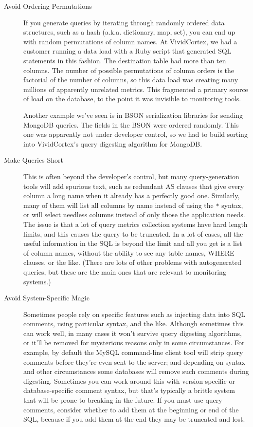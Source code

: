 \documentclass{vivid_layout}
\begin{document}
\begin{description}
\item[Avoid Ordering Permutations] If you generate queries by iterating through
randomly ordered data structures, such as a hash (a.k.a. dictionary, map, set),
you can end up with random permutations of column names. At VividCortex, we had a
customer running a data load with a Ruby script that generated SQL statements in
this fashion. The destination table had more than ten columns. The number of
possible permutations of column orders is the factorial of the number of
columns, so this data load was creating many millions of apparently unrelated
metrics. This fragmented a primary source of load on the database, to the point it
was invisible to monitoring tools.

Another example we've seen is in BSON serialization libraries for sending
MongoDB queries. The fields in the BSON were ordered randomly. This one was
apparently not under developer control, so we had to build sorting into
VividCortex's query digesting algorithm for MongoDB.

\item[Make Queries Short] This is often beyond the developer's control, but many
query-generation tools will add spurious text, such as redundant AS clauses that
give every column a long name when it already has a perfectly good one.
Similarly, many of them will list all columns by name instead of using the
\texttt{*} syntax, or will select needless columns instead of only those the
application needs. The issue is that a lot of query metrics collection systems
have hard length limits, and this causes the query to be truncated. In a lot of
cases, all the useful information in the SQL is beyond the limit and all you get
is a list of column names, without the ability to see any table names, WHERE
clauses, or the like. (There are lots of other problems with autogenerated
queries, but these are the main ones that are relevant to monitoring systems.)

\item[Avoid System-Specific Magic] Sometimes people rely on specific features
such as injecting data into SQL comments, using particular syntax, and the like.
Although sometimes this can work well, in many cases it won't survive query
digesting algorithms, or it'll be removed for mysterious reasons
only in some circumstances. For example, by default the MySQL command-line
client tool will strip query comments before they're even sent to the server;
and depending on syntax and other circumstances some databases will remove such
comments during digesting. Sometimes you can work around this with
version-specific or database-specific comment syntax, but that's typically a
brittle system that will be prone to breaking in the future. If you must use
query comments, consider whether to add them at the beginning or end of the SQL,
because if you add them at the end they may be truncated and lost.

\end{description}
\end{document}
